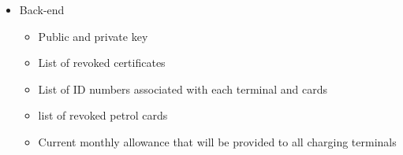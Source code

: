 \begin{itemize}
 \item Back-end
 \begin{itemize}
 	\item Public and private key
 	\item List of revoked certificates
 	\item List of ID numbers associated with each terminal and cards
 	\item list of revoked petrol cards
 	\item Current monthly allowance that will be provided to all charging terminals
 \end{itemize}

\end{itemize}
